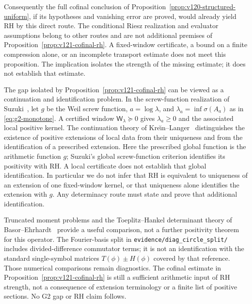 \documentclass[11pt]{article}
\theoremstyle{remark}
\begin{document}
Consequently the full cofinal conclusion of
Proposition~\ref{prop:v120-structured-uniform}, if its hypotheses and
vanishing error are proved, would already yield RH by this direct route.
The conditional Riesz realization and evaluator assumptions belong to
other routes and are not additional premises of
Proposition~\ref{prop:v121-cofinal-rh}. A fixed-window certificate,
a bound on a finite compression alone, or an incomplete transport
estimate does not meet this proposition. The implication isolates the
strength of the missing estimate; it does not establish that estimate.

The gap isolated by Proposition~\ref{prop:v121-cofinal-rh} can be
viewed as a continuation and identification problem. In the screw-function
realization of Suzuki~\cite{Suzuki2026}, let $g$ be the Weil screw
function, $a=\log\lambda$, and $\lambda_a=\inf\sigma(A_a)$ as in
\eqref{eq:g2-monotone}. A certified window
$\mathsf W_\lambda\succeq0$ gives $\lambda_a\ge0$ and the associated
local positive kernel. The continuation theory of
Kre\u{\i}n--Langer~\cite{KreinLanger2014} distinguishes the existence of
positive extensions of local data from their uniqueness and from the
identification of a prescribed extension. Here the prescribed global
function is the arithmetic function $g$; Suzuki's global screw-function
criterion identifies its positivity with RH. A local certificate does
not establish that global identification. In particular we do not infer
that RH is equivalent to uniqueness of an extension of one fixed-window
kernel, or that uniqueness alone identifies the extension with $g$.
Any determinacy route must state and prove that additional identification.

Truncated moment problems and the Toeplitz--Hankel determinant theory
of Basor--Ehrhardt~\cite{BasorEhrhardt2002} provide a useful comparison,
not a further positivity theorem for this operator. The Fourier-basis
split in \texttt{evidence/diag\_circle\_split/} includes divided-difference
commutator terms; it is not an identification with the standard
single-symbol matrices $T(\phi)\pm H(\phi)$ covered by that reference.
Those numerical comparisons remain diagnostics. The cofinal estimate in
Proposition~\ref{prop:v121-cofinal-rh} is still a sufficient arithmetic
input of RH strength, not a consequence of extension terminology or a
finite list of positive sections. No G2 gap or RH claim follows.
\end{document}
